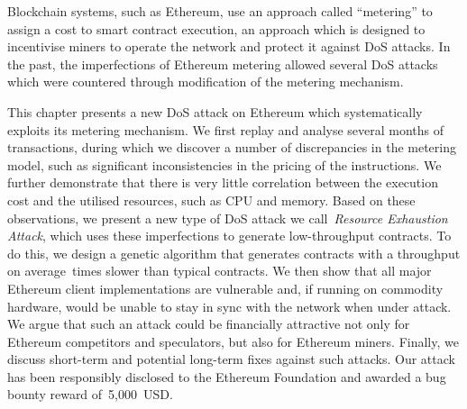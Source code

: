 


  Blockchain systems, such as Ethereum, use an approach called ``metering'' to assign a cost to smart contract execution, an approach which is designed to incentivise miners to operate the network and protect it against DoS attacks. In the past, the imperfections of Ethereum metering allowed several DoS attacks which were countered through modification of the metering mechanism.

  This chapter presents a new DoS attack on Ethereum which systematically exploits its metering mechanism. We first replay and analyse several months of transactions, during which we discover a number of discrepancies in the metering model, such as significant inconsistencies in the pricing of the instructions. We further demonstrate that there is very little correlation between the execution cost and the utilised resources, such as CPU and memory. Based on these observations, we present a new type of DoS attack we call~\emph{Resource Exhaustion Attack}, which uses these imperfections to generate low-throughput contracts. To do this, we design a genetic algorithm that generates contracts with a throughput on average~\Slowdown times slower than typical contracts. We then show that all major Ethereum client implementations are vulnerable and, if running on commodity hardware, would be unable to stay in sync with the network when under attack. We argue that such an attack could be financially attractive not only for Ethereum competitors and speculators, but also for Ethereum miners. Finally, we discuss short-term and potential long-term fixes against such attacks. Our attack has been responsibly disclosed to the Ethereum Foundation and awarded a bug bounty reward of~5,000~USD.
